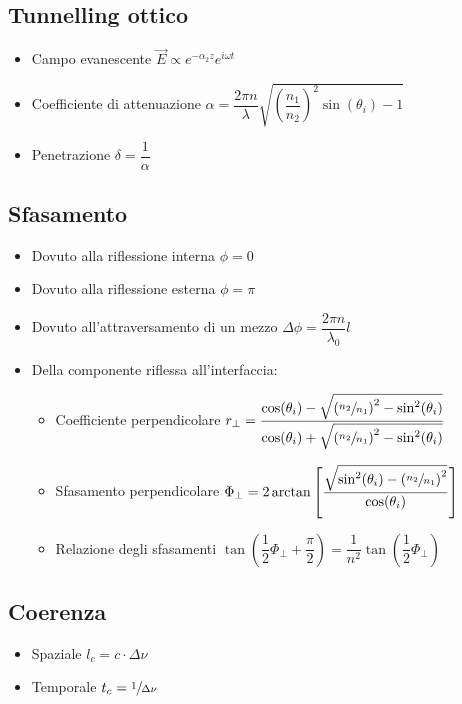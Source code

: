 \documentclass{article}
\begin{document}
\subsection{Tunnelling ottico}
\begin{itemize}
  \item Campo evanescente \( \vec{E} \propto e^{-\alpha_2 z} e ^ { i \omega t } \)
  \item Coefficiente di attenuazione \( \alpha = \dfrac{2 \pi n}{\lambda} \sqrt{ \left( \dfrac{n_1}{n_2} \right) ^ 2 \sin(\theta_i) - 1} \)
  \item Penetrazione \( \delta = \dfrac{1}{\alpha} \)
\end{itemize}

\newpage

\subsection{Sfasamento}
\begin{itemize}
  \item Dovuto alla riflessione interna \( \phi = 0 \)
  \item Dovuto alla riflessione esterna \( \phi = \pi \)
  \item Dovuto all'attraversamento di un mezzo \( \Delta \phi = \dfrac{2 \pi n}{\lambda_0} l \)
  \item Della componente riflessa all'interfaccia:
        \begin{itemize}
          \item Coefficiente perpendicolare \( r_\perp = \dfrac{\cos(\theta_i) - \sqrt{\left( \sfrac{n_2}{n_1} \right) ^ 2 - \sin^2(\theta_i)}}{\cos(\theta_i) + \sqrt{\left( \sfrac{n_2}{n_1} \right) ^ 2 - \sin^2(\theta_i)}} \)
          \item Sfasamento perpendicolare \( \Phi_\perp = 2 \arctan \left[ \dfrac{ \sqrt{\sin^2(\theta_i) - \left( \sfrac{n_2}{n_1} \right) ^ 2 } }{ \cos(\theta_i) } \right] \)
          \item Relazione degli sfasamenti \( \tan \left( \dfrac{1}{2} \Phi_\perp + \dfrac{\pi}{2} \right) = \dfrac{1}{n ^ 2} \tan \left( \dfrac{1}{2} \Phi_\perp \right) \)
        \end{itemize}
\end{itemize}

\subsection{Coerenza}
\begin{itemize}
  \item Spaziale \( l_c = c \cdot \Delta \nu \)
  \item Temporale \( t_c = \sfrac{1}{\Delta \nu} \)
\end{itemize}
\end{document}
